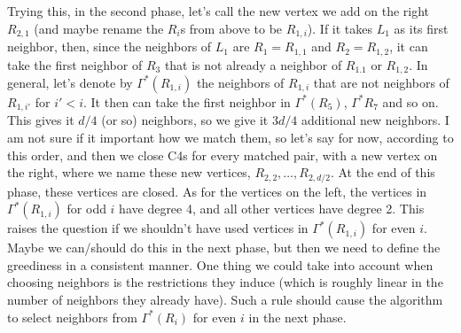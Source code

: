 \documentclass{article}
\begin{document}
Trying this, in the second phase,  let's call the new vertex we add on the right $R_{2,1}$ (and maybe rename the $R_i$s from above to be $R_{1,i}$). If it takes $L_1$ as its first neighbor, then, since the neighbors of $L_1$ are $R_1 = R_{1,1}$ and $R_2 = R_{1,2}$, it can take the first neighbor of $R_3$ that is not already a neighbor of $R_{1.1}$ or $R_{1,2}$. In general, let's denote by $\Gamma^{*}(R_{1,i})$ the neighbors of $R_{1,i}$ that are not neighbors of $R_{1,i'}$ for $i' < i$. It then can take the first neighbor in $\Gamma^*(R_5)$, $\Gamma^*{R_7}$ and so on. This gives it $d/4$ (or so) neighbors, so we give it $3d/4$ additional new neighbors. I am not sure if it important how we match them, so let's say for now, according to this order, and then we close C4s for every matched pair, with a new vertex on the right, where we name these new vertices, $R_{2,2},\dots,R_{2,d/2}$.
At the end of this phase, these vertices are closed. As for the vertices on the left, the vertices in $\Gamma^*(R_{1,i})$ for odd $i$ have degree 4, and all other vertices have degree 2. This raises the question if we shouldn't have used vertices in $\Gamma^*(R_{1,i})$ for even $i$. Maybe we can/should do this in the next phase, but then we need to define the greediness in a consistent manner. One thing we could take into account when choosing neighbors is the restrictions they induce (which is roughly linear in the number of neighbors they already have). Such a rule should cause the algorithm to select neighbors from $\Gamma^*(R_i)$ for even $i$ in the next phase.
%

%
\end{document}
